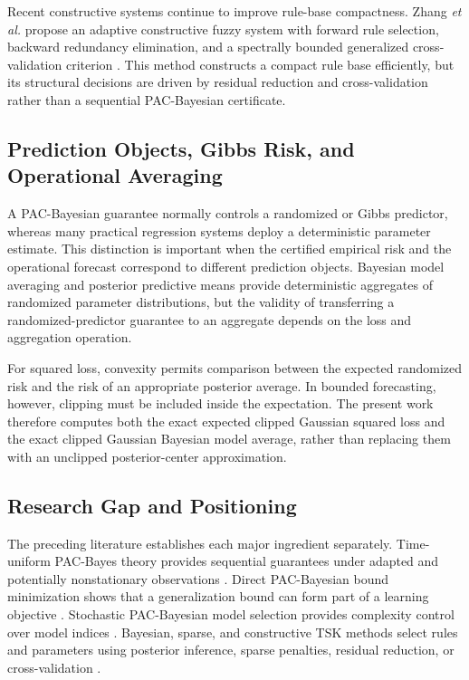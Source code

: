 Recent constructive systems continue to improve rule-base compactness. Zhang \emph{et al.} propose an adaptive constructive fuzzy system with forward rule
selection, backward redundancy elimination, and a spectrally bounded generalized cross-validation criterion \cite{zhang2026acfs}. This method
constructs a compact rule base efficiently, but its structural decisions are driven by residual reduction and cross-validation rather than a sequential
PAC-Bayesian certificate.

\subsection{Prediction Objects, Gibbs Risk, and Operational Averaging}

A PAC-Bayesian guarantee normally controls a randomized or Gibbs predictor, whereas many practical regression systems deploy a deterministic parameter
estimate. This distinction is important when the certified empirical risk and the operational forecast correspond to different prediction objects.
Bayesian model averaging and posterior predictive means provide deterministic aggregates of randomized parameter distributions, but the validity of
transferring a randomized-predictor guarantee to an aggregate depends on the loss and aggregation operation.

For squared loss, convexity permits comparison between the expected randomized risk and the risk of an appropriate posterior average. In bounded forecasting, however, clipping must be included inside the expectation. The present work therefore computes both the exact expected clipped Gaussian squared loss and the exact clipped Gaussian Bayesian model average, rather than replacing them with an unclipped posterior-center approximation.



\subsection{Research Gap and Positioning}

The preceding literature establishes each major ingredient separately.
Time-uniform PAC-Bayes theory provides sequential guarantees under adapted and potentially nonstationary observations \cite{chugg2023unified}. Direct PAC-Bayesian bound minimization shows that a generalization bound can form part of a learning objective \cite{wang2023direct}. Stochastic PAC-Bayesian model selection provides complexity control over model indices \cite{mcallester2003stochastic}. Bayesian, sparse, and constructive TSK methods select rules and parameters using posterior inference, sparse penalties, residual reduction, or cross-validation  \cite{gu2018btsk,li2018blocksparse,luo2013hierarchical,zhang2026acfs}.

